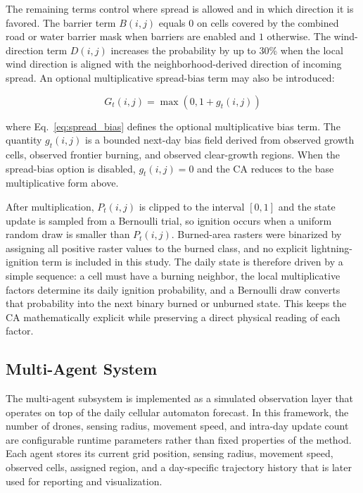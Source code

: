 \documentclass[10pt,letterpaper]{article}
\begin{document}
The remaining terms control where spread is allowed and in which
direction it is favored. The barrier term $B(i,j)$ equals $0$ on cells
covered by the combined road or water barrier mask when barriers are
enabled and $1$ otherwise. The wind-direction term $D(i,j)$ increases
the probability by up to 30\% when the local wind direction is aligned
with the neighborhood-derived direction of incoming spread. An optional
multiplicative spread-bias term may also be introduced:

\begin{equation}
G_t(i,j)=\max\left(0,1+g_t(i,j)\right)
\label{eq:spread_bias}
\end{equation}

where Eq.~\ref{eq:spread_bias} defines the optional multiplicative bias
term. The quantity $g_t(i,j)$ is a bounded next-day bias field derived from observed
growth cells, observed frontier burning, and observed clear-growth
regions. When the spread-bias option is disabled, $g_t(i,j)=0$ and the
CA reduces to the base multiplicative form above.

After multiplication, $P_t(i,j)$ is clipped to the interval $[0,1]$ and
the state update is sampled from a Bernoulli trial, so ignition occurs
when a uniform random draw is smaller than $P_t(i,j)$. Burned-area
rasters were binarized by assigning all positive raster values to the
burned class, and no
explicit lightning-ignition term is included in this study. The daily
state is therefore driven by a simple sequence: a cell must have a
burning neighbor, the local multiplicative factors determine its daily
ignition probability, and a Bernoulli draw converts that probability
into the next binary burned or unburned state. This keeps the CA
mathematically explicit while preserving a direct physical reading of
each factor.

\subsection*{Multi-Agent System}

The multi-agent subsystem is implemented as a simulated observation
layer that operates on top of the daily cellular automaton forecast. In
this framework, the number of drones, sensing radius,
movement speed, and intra-day update count are configurable runtime
parameters rather than fixed properties of the method. Each agent stores
its current grid position, sensing radius, movement speed, observed
cells, assigned region, and a day-specific trajectory history that is
later used for reporting and visualization.
\end{document}
